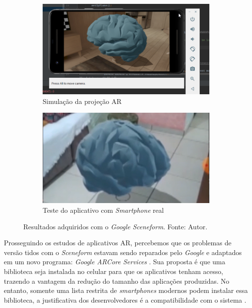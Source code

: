 \begin{figure}[ht]
\centering
    \begin{subfigure}{.45\textwidth}
        \centering
        \includegraphics[width=.95\textwidth]{figuras/sceneform.png}
        \caption{Simulação da projeção AR }
        \label{fig:sceneform-sim}
    \end{subfigure}
    \begin{subfigure}{.45\textwidth}
        \centering
        \includegraphics[width=.95\textwidth]{figuras/sceneformAR.png}
        \caption{Teste do aplicativo com \textit{Smartphone} real}
        \label{fig:sceneform-real}
    \end{subfigure}
    \caption{Resultados adquiridos com o \textit{Google Sceneform}. Fonte: Autor.}
    \label{fig:sceneform-tests}
\end{figure}

Prosseguindo os estudos de aplicativos AR, percebemos que os problemas de versão tidos com o \textit{Sceneform} estavam sendo reparados pelo \textit{Google} e adaptados em um novo programa: \textit{Google ARCore Services} \cite{arcore-googleplay}. Sua proposta é que uma biblioteca seja instalada no celular para que os aplicativos tenham acesso, trazendo a vantagem da redução do tamanho das aplicações produzidas. No entanto, somente uma lista restrita de \textit{smartphones} modernos podem instalar essa biblioteca, a justificativa dos desenvolvedores é a compatibilidade com o sistema \cite{arcore-list}.

